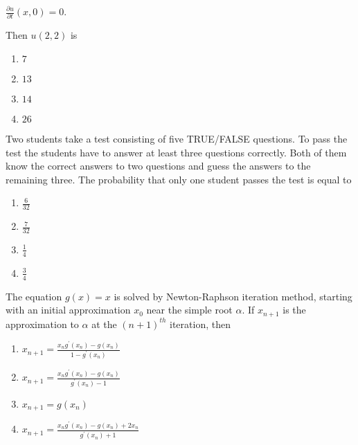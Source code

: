         $\frac{\partial u}{\partial t}(x,0)=0$.

        Then $u(2,2)$ is
        \begin{enumerate}
            \item $7$
            \item $13$
            \item $14$
            \item $26$
        \end{enumerate}

    \item Two students take a test consisting of five TRUE/FALSE questions. To pass the test the students have to answer at least three questions correctly. Both of them know the correct answers to two questions and guess the answers to the remaining three. The probability that only one student passes the test is equal to
        \begin{enumerate}
            \item $\frac{6}{32}$
            \item $\frac{7}{32}$
            \item $\frac{1}{4}$
            \item $\frac{3}{4}$
        \end{enumerate}

    \item The equation $g(x)=x$ is solved by Newton-Raphson iteration method, starting with an initial approximation $x_0$ near the simple root $\alpha$. If $x_{n+1}$ is the approximation to $\alpha$ at the $(n+1)^{th}$ iteration, then
        \begin{enumerate}
            \item $x_{n+1}=\frac{x_ng^\prime(x_n)-g(x_n)}{1-g^\prime(x_n)}$
            \item $x_{n+1}=\frac{x_ng^\prime(x_n)-g(x_n)}{g^\prime(x_n)-1}$
            \item $x_{n+1}=g(x_n)$
            \item $x_{n+1}=\frac{x_ng^\prime(x_n)-g(x_n)+2x_n}{g^\prime(x_n)+1}$
        \end{enumerate}
